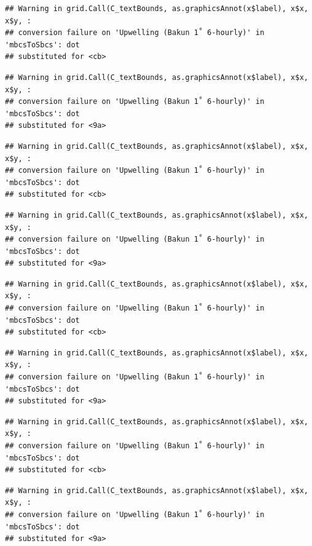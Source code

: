 \documentclass[
]{article}
\begin{document}
\begin{verbatim}
## Warning in grid.Call(C_textBounds, as.graphicsAnnot(x$label), x$x, x$y, :
## conversion failure on 'Upwelling (Bakun 1˚ 6-hourly)' in 'mbcsToSbcs': dot
## substituted for <cb>
\end{verbatim}

\begin{verbatim}
## Warning in grid.Call(C_textBounds, as.graphicsAnnot(x$label), x$x, x$y, :
## conversion failure on 'Upwelling (Bakun 1˚ 6-hourly)' in 'mbcsToSbcs': dot
## substituted for <9a>
\end{verbatim}

\begin{verbatim}
## Warning in grid.Call(C_textBounds, as.graphicsAnnot(x$label), x$x, x$y, :
## conversion failure on 'Upwelling (Bakun 1˚ 6-hourly)' in 'mbcsToSbcs': dot
## substituted for <cb>
\end{verbatim}

\begin{verbatim}
## Warning in grid.Call(C_textBounds, as.graphicsAnnot(x$label), x$x, x$y, :
## conversion failure on 'Upwelling (Bakun 1˚ 6-hourly)' in 'mbcsToSbcs': dot
## substituted for <9a>
\end{verbatim}

\begin{verbatim}
## Warning in grid.Call(C_textBounds, as.graphicsAnnot(x$label), x$x, x$y, :
## conversion failure on 'Upwelling (Bakun 1˚ 6-hourly)' in 'mbcsToSbcs': dot
## substituted for <cb>
\end{verbatim}

\begin{verbatim}
## Warning in grid.Call(C_textBounds, as.graphicsAnnot(x$label), x$x, x$y, :
## conversion failure on 'Upwelling (Bakun 1˚ 6-hourly)' in 'mbcsToSbcs': dot
## substituted for <9a>
\end{verbatim}

\begin{verbatim}
## Warning in grid.Call(C_textBounds, as.graphicsAnnot(x$label), x$x, x$y, :
## conversion failure on 'Upwelling (Bakun 1˚ 6-hourly)' in 'mbcsToSbcs': dot
## substituted for <cb>
\end{verbatim}

\begin{verbatim}
## Warning in grid.Call(C_textBounds, as.graphicsAnnot(x$label), x$x, x$y, :
## conversion failure on 'Upwelling (Bakun 1˚ 6-hourly)' in 'mbcsToSbcs': dot
## substituted for <9a>
\end{verbatim}
\end{document}
